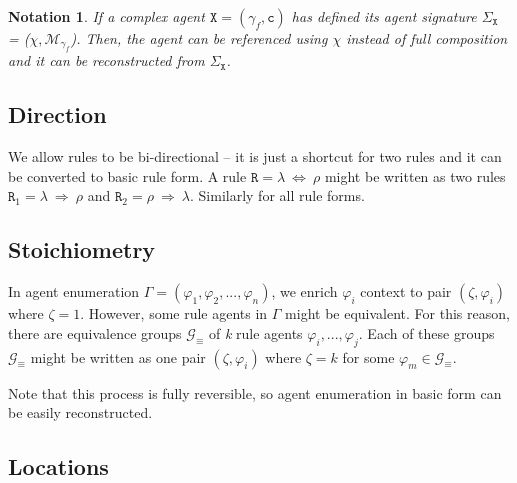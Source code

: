 \documentclass{entcs}
\renewcommand{\~}[0]{\texttildelow}
\newtheorem{notation}[thm]{Notation}
\begin{document}
\begin{notation}
If a complex agent $\mathtt{X} = (\gamma_f, \mathtt{c})$ has defined its agent signature $\Sigma_\mathtt{X}$ = ($\chi, \mathcal{M}_{\gamma_f}$). Then, the agent can be referenced using $\chi$ instead of full composition and it can be reconstructed from $\Sigma_\mathtt{X}$.
\end{notation}

\subsection{Direction}

We allow rules to be bi-directional -- it is just a shortcut for two rules and it can be converted to basic rule form. A rule $\mathtt{R} = \lambda ~\Leftrightarrow~ \rho$ might be written as two rules $\mathtt{R}_1 = \lambda ~\Rightarrow~ \rho$ and $\mathtt{R}_2 = \rho ~\Rightarrow~ \lambda$. Similarly for all rule forms.

\subsection{Stoichiometry}

In agent enumeration $\Gamma = (\varphi_1, \varphi_2, ..., \varphi_n)$, we enrich $\varphi_i$ context to pair $(\zeta, \varphi_i)$ where $\zeta = 1$. However, some rule agents in $\Gamma$ might be equivalent. For this reason, there are equivalence groups $\mathcal{G}_\equiv$ of \textit{k} rule agents $\varphi_i, ..., \varphi_j$. Each of these groups $\mathcal{G}_\equiv$ might be written as one pair $(\zeta, \varphi_i)$ where $\zeta = k$ for some $\varphi_m \in \mathcal{G}_\equiv$.

Note that this process is fully reversible, so agent enumeration in basic form can be easily reconstructed.

\subsection{Locations}
\end{document}
